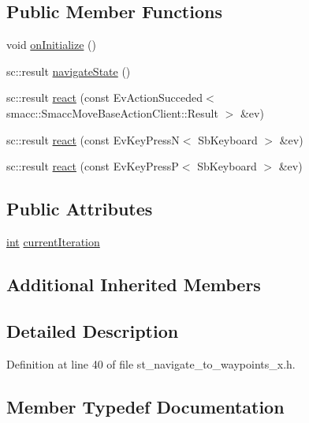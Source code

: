 \subsection*{Public Member Functions}
\begin{DoxyCompactItemize}
\item 
void \hyperlink{structStNavigateToWaypointsX_ac5f251c0431495e14c458a298592b663}{on\+Initialize} ()
\item 
sc\+::result \hyperlink{structStNavigateToWaypointsX_a0df2892ed95cae253b2ae0c09c850268}{navigate\+State} ()
\item 
sc\+::result \hyperlink{structStNavigateToWaypointsX_aab643c73ebd67edd5d16e186b0ab527f}{react} (const Ev\+Action\+Succeded$<$ smacc\+::\+Smacc\+Move\+Base\+Action\+Client\+::\+Result $>$ \&ev)
\item 
sc\+::result \hyperlink{structStNavigateToWaypointsX_ab9973901dfb0db2035223ec81d6fe0df}{react} (const Ev\+Key\+PressN$<$ Sb\+Keyboard $>$ \&ev)
\item 
sc\+::result \hyperlink{structStNavigateToWaypointsX_aa2d1a8c49b4c3227201eb300e21e53c1}{react} (const Ev\+Key\+PressP$<$ Sb\+Keyboard $>$ \&ev)
\end{DoxyCompactItemize}
\subsection*{Public Attributes}
\begin{DoxyCompactItemize}
\item 
\hyperlink{classint}{int} \hyperlink{structStNavigateToWaypointsX_a2f597fd0ee0258ef66506e98d55e8060}{current\+Iteration}
\end{DoxyCompactItemize}
\subsection*{Additional Inherited Members}


\subsection{Detailed Description}


Definition at line 40 of file st\+\_\+navigate\+\_\+to\+\_\+waypoints\+\_\+x.\+h.



\subsection{Member Typedef Documentation}
